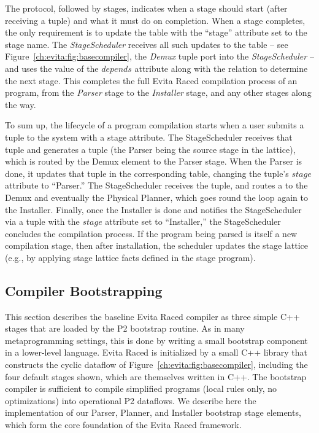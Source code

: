 The protocol, followed by stages, indicates when a stage should start (after
receiving a  tuple) and what it must do on
completion.  When a stage completes, the only requirement is to update the
 table with the ``stage'' attribute set to the stage name.  The
{\em StageScheduler} receives all such updates to the  table -- see
Figure~\ref{ch:evita:fig:basecompiler}, the {\em Demux}  tuple port
into the {\em StageScheduler} -- and uses the value of the 
$depends$ attribute along with the  relation to determine the
next stage.  This completes the full Evita Raced compilation process of an
\OVERLOG program, from the {\em Parser} stage to the {\em Installer} stage, and
any other stages along the way.

To sum up, the lifecycle of a program compilation starts when a user submits a
 tuple to the system with a  stage attribute.  The
StageScheduler receives that  tuple and generates a
 tuple (the Parser being the source stage in the
lattice), which is routed by the Demux element to the Parser stage.  When the
Parser is done, it updates that  tuple in the corresponding table,
changing the tuple's $stage$ attribute to ``Parser.'' The StageScheduler
receives the  tuple, and routes a  to the
Demux and eventually the Physical Planner, which goes round the loop again to
the Installer.  Finally, once the Installer is done and notifies the
StageScheduler via a  tuple with the $stage$ attribute set to
``Installer,'' the StageScheduler concludes the compilation process.  If the
\OVERLOG program being parsed is itself a new compilation stage, then after
installation, the scheduler updates the stage lattice (e.g., by applying 
stage lattice facts defined in the stage program).


\subsection{Compiler Bootstrapping}
\label{ch:evita:sec:bootstrap}

This section describes the baseline Evita Raced compiler as three simple C++
stages that are loaded by the P2 bootstrap routine.  As in many metaprogramming
settings, this is done by writing a small bootstrap component in a lower-level
language.  Evita Raced is initialized by a small C++ library that constructs
the cyclic dataflow of Figure~\ref{ch:evita:fig:basecompiler}, including the
four default stages shown, which are themselves written in C++.  The bootstrap
compiler is sufficient to compile simplified \OVERLOG programs (local rules
only, no optimizations) into operational P2 dataflows.  We describe here the
implementation of our Parser, Planner, and Installer bootstrap stage elements,
which form the core foundation of the Evita Raced framework.

